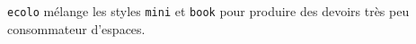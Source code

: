 %

\verb+ecolo+ mélange les styles \verb+mini+ et \verb+book+ pour produire des devoirs très peu consommateur d'espaces.
